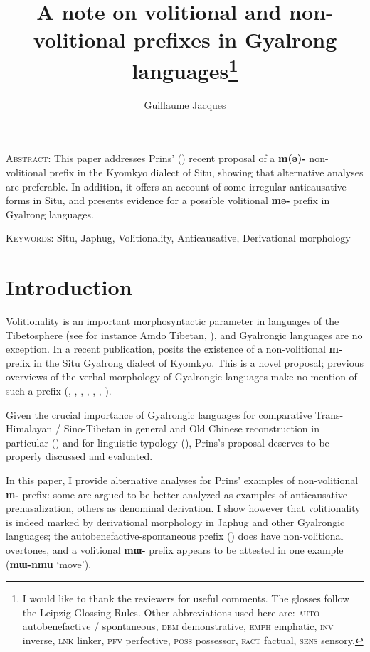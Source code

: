 \documentclass[oneside,a4paper,11pt]{article}
\newcommand{\ipa}[1]{\textbf{{\phon\mbox{#1}}}} %
\begin{document}
\title{A note on volitional and non-volitional prefixes in Gyalrong languages\footnote{I would like to thank the reviewers for useful comments. The glosses follow the Leipzig Glossing Rules. Other abbreviations used here are:  \textsc{auto} autobenefactive / spontaneous,  \textsc{dem} demonstrative,  \textsc{emph} emphatic, \textsc{inv} inverse,  \textsc{lnk} linker, \textsc{pfv} perfective, \textsc{poss} possessor, \textsc{fact} factual,  \textsc{sens} sensory. }}
\author{Guillaume Jacques}
\maketitle

\textsc{Abstract}: This paper addresses Prins' (\citeyear{prins16kyomkyo}) recent proposal of a \ipa{m(ə)-} non-volitional prefix in the Kyomkyo dialect of Situ, showing that alternative analyses are preferable. In addition, it offers an account of some irregular anticausative forms in Situ, and presents evidence for a possible volitional \ipa{mə-} prefix in Gyalrong languages.

\textsc{Keywords}: Situ, Japhug, Volitionality, Anticausative, Derivational morphology

\section*{Introduction}
Volitionality is an important morphosyntactic parameter in languages of the Tibetosphere (see for instance Amdo Tibetan, \citealt[960-3]{sun93evidentiality}), and Gyalrongic languages are no exception. In a recent publication, \citet[505-6]{prins16kyomkyo} posits the existence of a non-volitional \ipa{m-} prefix in the Situ Gyalrong dialect of Kyomkyo. This is a novel proposal; previous overviews of the verbal  morphology of Gyalrongic languages make no mention of such a prefix (\citealt{jackson03caodeng}, \citealt{jackson06paisheng}, \citealt{jacques12demotion}, \citealt{lai13affixale}, \citealt{jackson14morpho},  \citealt{linyj16cogtse}, \citealt{jacques17sketch}).

Given the crucial importance of Gyalrongic languages for comparative Trans-Himalayan / Sino-Tibetan in general and Old Chinese reconstruction in particular (\citealt{gong17xingtaixue, gong17clusters}) and for linguistic typology (\citealt{jacques13harmonization, jacques14antipassive}), Prins's proposal deserves to be properly discussed and  evaluated.

In this paper, I provide alternative analyses for Prins' examples of non-volitional \ipa{m-} prefix: some are argued to be better analyzed as examples of anticausative prenasalization, others as denominal derivation. I show however that volitionality is indeed marked by derivational morphology in Japhug and other Gyalrongic languages; the autobenefactive-spontaneous prefix (\citealt{jacques15spontaneous}) does have non-volitional overtones, and a volitional \ipa{mɯ-} prefix appears to be attested in one example (\ipa{mɯ-nmu} `move').
\end{document}

